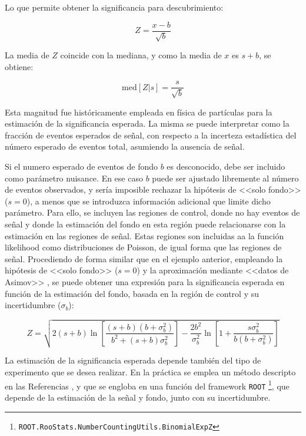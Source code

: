 Lo que permite obtener la significancia para descubrimiento:

\begin{equation}
	Z = \frac{x-b}{\sqrt{b}}
\end{equation}

La media de $Z$ coincide con la mediana, y como la media de $x$ es $s+b$, se obtiene:

\begin{equation}
	\text{med}[Z|s] = \frac{s}{\sqrt{b}}
\end{equation}

Esta magnitud fue históricamente empleada en física de partículas para la estimación de la significancia esperada. La misma se puede interpretar como la fracción de eventos esperados de señal, con respecto a la incerteza estadística del número esperado de eventos total, asumiendo la ausencia de señal.

Si el numero esperado de eventos de fondo $b$ es desconocido, debe ser incluido como parámetro nuisance. En ese caso $b$ puede ser ajustado libremente al número de eventos observados, y sería imposible rechazar la hipótesis de <<solo fondo>> ($s=0$), a menos que se introduzca información adicional que limite dicho parámetro. Para ello, se incluyen las regiones de control, donde no hay eventos de señal y donde la estimación del fondo en esta región puede relacionarse con la estimación en las regiones de señal. Estas regiones son incluidas aa la función likelihood como distribuciones de Poisson, de igual forma que las regiones de señal. Procediendo de forma similar que en el ejemplo anterior, empleando la hipótesis de <<solo fondo>> ($s=0$) y la aproximación mediante <<datos de Asimov>> \cite{Cowan:2010js}, se puede obtener una expresión para la significancia esperada en función de la estimación del fondo, basada en la región de control y su incertidumbre ($\sigma_b$):

\begin{equation}
	Z = \sqrt{ 2 (s+b) \ln{\left[ \frac{(s+b)(b+\sigma_b^2)}{b^2 + (s+b)\sigma_b^2} \right]} - \frac{2 b^2}{\sigma_b^2} \ln{ \left[ 1 + \frac{s \sigma_b^2}{b(b+\sigma_b^2)} \right] } }
\end{equation}

La estimación de la significancia esperada depende también del tipo de experimento que se desea realizar. En la práctica se emplea un método descripto en las Referencias \cite{Linnemann:2003vw, stat_1, ATL-PHYS-PUB-2020-025}, y que se engloba en una función del framework \texttt{ROOT} \footnote{\texttt{ROOT.RooStats.NumberCountingUtils.BinomialExpZ}}, que depende de la estimación de la señal y fondo, junto con su incertidumbre. 

